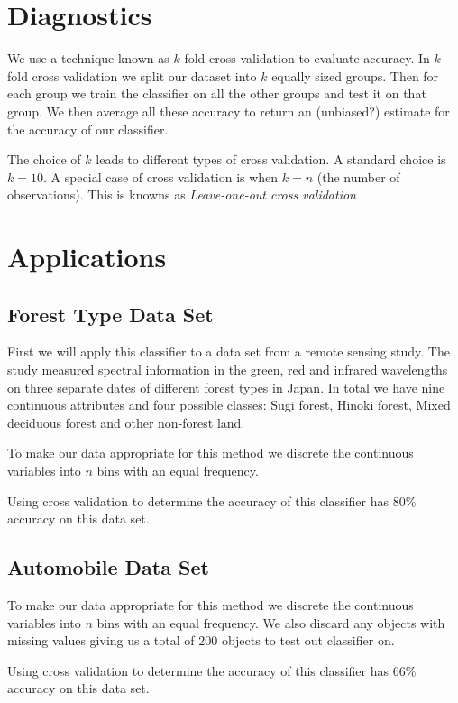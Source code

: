 \section{Diagnostics}

We use a technique known as $k$-fold cross validation to evaluate accuracy. In $k$-fold cross validation we split our dataset into $k$ equally sized groups. Then for each group we train the classifier on all the other groups and test it on that group. We then average all these accuracy to return an (unbiased?) estimate for the accuracy of our classifier.

The choice of $k$ leads to different types of cross validation. A standard choice is $k=10$. A special case of cross validation is when $k=n$ (the number of observations). This is knowns as \textit{Leave-one-out cross validation} \cite{Priddy05}.

\section{Applications}

\subsection{Forest Type Data Set}

First we will apply this classifier to a data set from a remote sensing study. The study measured spectral information in the green, red and infrared wavelengths on three separate dates of different forest types in Japan. In total we have nine continuous attributes and four possible classes: Sugi forest, Hinoki forest, Mixed deciduous forest and other non-forest land.

To make our data appropriate for this method we discrete the continuous variables into $n$ bins with an equal frequency.

Using cross validation to determine the accuracy of this classifier has 80\% accuracy on this data set.

\subsection{Automobile Data Set}

To make our data appropriate for this method we discrete the continuous variables into $n$ bins with an equal frequency. We also discard any objects with missing values giving us a total of 200 objects to test out classifier on.

Using cross validation to determine the accuracy of this classifier has 66\% accuracy on this data set.

